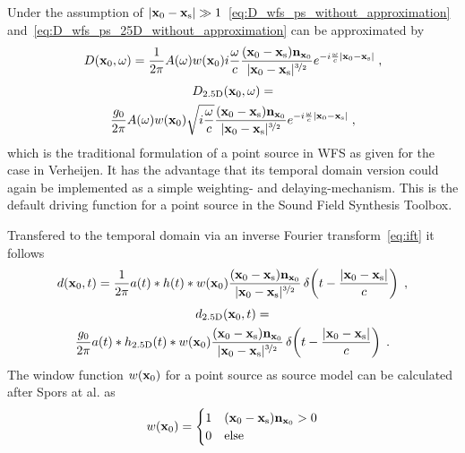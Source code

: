 %
Under the assumption of $|\mathbf{x}_0-\mathbf{x}_\text{s}| \gg
1$~\eqref{eq:D_wfs_ps_without_approximation}
and~\eqref{eq:D_wfs_ps_25D_without_approximation} can be approximated by
%
\begin{equation}
    D(\x_0,\omega) = \frac{1}{2\pi} A(\omega) w(\x_0) i\omegac
    \frac{(\x_0-\xs)\n_{\x_0}}{|\x_0-\xs|^{\nicefrac{3}{2}}}
    e^{-i\omegac |\x_0-\xs|} \qc
    \label{eq:D_wfs_ps}
\end{equation}
%
\begin{multline}
    D_\twohalfD(\x_0,\omega) = \\
    \frac{g_0}{2\pi} A(\omega) w(\x_0) \sqrt{i\omegac}
    \frac{(\x_0-\xs)\n_{\x_0}}{|\x_0-\xs|^{\nicefrac{3}{2}}}
    e^{-i\omegac |\x_0-\xs|} \qc
    \label{eq:D_wfs_ps_25D}
\end{multline}
%
which is the traditional formulation of a point source in
\ac{WFS} as given for the \twohalfD case in
Verheijen.\autocite[][(2.22a), whereby $r$ corresponds to $|\x_0-\xs|$ and
$\cos\varphi$ to $\frac{(\x_0-\xs)\n_{\x_0}}{|\x_0-\xs|}$]{Verheijen1997}
It has the advantage that its temporal domain version could again be implemented as
a simple weighting- and delaying-mechanism.
This is the default driving function for a point source in the Sound Field
Synthesis Toolbox.

Transfered to the temporal domain via an inverse Fourier transform~\eqref{eq:ift} it follows
%
\begin{equation}
    d(\x_0,t) = \frac{1}{2\pi} a(t) * h(t) * w(\x_0)
    \frac{(\x_0-\xs)\n_{\x_0}}{|\x_0-\xs|^{\nicefrac{3}{2}}}
    \deltafunc{t-\frac{|\x_0-\xs|}{c}} \qc
    \label{eq:d_wfs_ps}
\end{equation}
%
\begin{multline}
    d_\twohalfD(\x_0,t) = \\
    \frac{g_0}{2\pi} a(t) * h_\twohalfD(t) * w(\x_0)
    \frac{(\x_0-\xs)\n_{\x_0}}{|\x_0-\xs|^{\nicefrac{3}{2}}}
    \deltafunc{t-\frac{|\x_0-\xs|}{c}} \qp
    \label{eq:d_wfs_ps_25D}
\end{multline}
%
The window function $w(\mathbf{x}_0)$ for a point source as source model can be
calculated after Spors at al. as\autocite{Spors2008}
%
\begin{equation}
    w(\x_0) = 
    \begin{cases}
        1 & (\x_0-\xs) \n_{\x_0} > 0 \\
        0 & \text{else}
    \end{cases}
    \label{eq:w_ps}
\end{equation}
%



